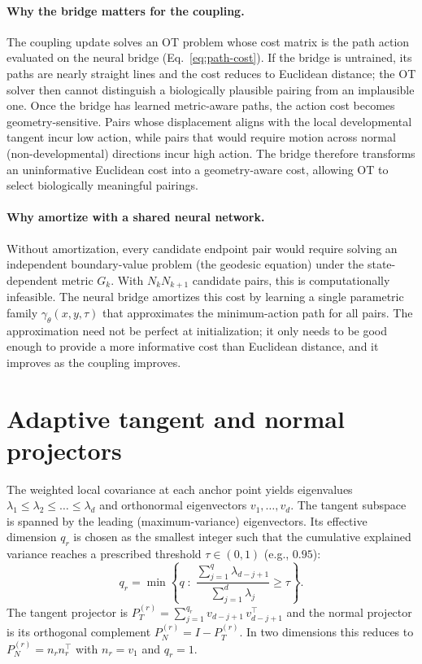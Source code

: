\paragraph{Why the bridge matters for the coupling.}
The coupling update solves an OT problem whose cost matrix is the path action evaluated on the neural bridge (Eq.~\eqref{eq:path-cost}). If the bridge is untrained, its paths are nearly straight lines and the cost reduces to Euclidean distance; the OT solver then cannot distinguish a biologically plausible pairing from an implausible one. Once the bridge has learned metric-aware paths, the action cost becomes geometry-sensitive. Pairs whose displacement aligns with the local developmental tangent incur low action, while pairs that would require motion across normal (non-developmental) directions incur high action. The bridge therefore transforms an uninformative Euclidean cost into a geometry-aware cost, allowing OT to select biologically meaningful pairings.

\paragraph{Why amortize with a shared neural network.}
Without amortization, every candidate endpoint pair would require solving an independent boundary-value problem (the geodesic equation) under the state-dependent metric $G_k$. With $N_k N_{k+1}$ candidate pairs, this is computationally infeasible. The neural bridge amortizes this cost by learning a single parametric family $\gamma_\theta(x,y,\tau)$ that approximates the minimum-action path for all pairs. The approximation need not be perfect at initialization; it only needs to be good enough to provide a more informative cost than Euclidean distance, and it improves as the coupling improves.

\section{Adaptive tangent and normal projectors}
\label{app:adaptive-projectors}

The weighted local covariance at each anchor point yields eigenvalues $\lambda_1 \le \lambda_2 \le \dots \le \lambda_d$ and orthonormal eigenvectors $v_1,\dots,v_d$.
The tangent subspace is spanned by the leading (maximum-variance) eigenvectors. Its effective dimension $q_r$ is chosen as the smallest integer such that the cumulative explained variance reaches a prescribed threshold $\tau \in (0,1)$ (e.g., $0.95$):
\[
q_r = \min\!\left\{q \;:\; \frac{\sum_{j=1}^{q} \lambda_{d-j+1}}{\sum_{j=1}^{d} \lambda_j} \ge \tau\right\}.
\]
The tangent projector is $P_T^{(r)} = \sum_{j=1}^{q_r} v_{d-j+1}\,v_{d-j+1}^\top$ and the normal projector is its orthogonal complement $P_N^{(r)} = I - P_T^{(r)}$.
In two dimensions this reduces to $P_N^{(r)} = n_r n_r^\top$ with $n_r = v_1$ and $q_r = 1$.

